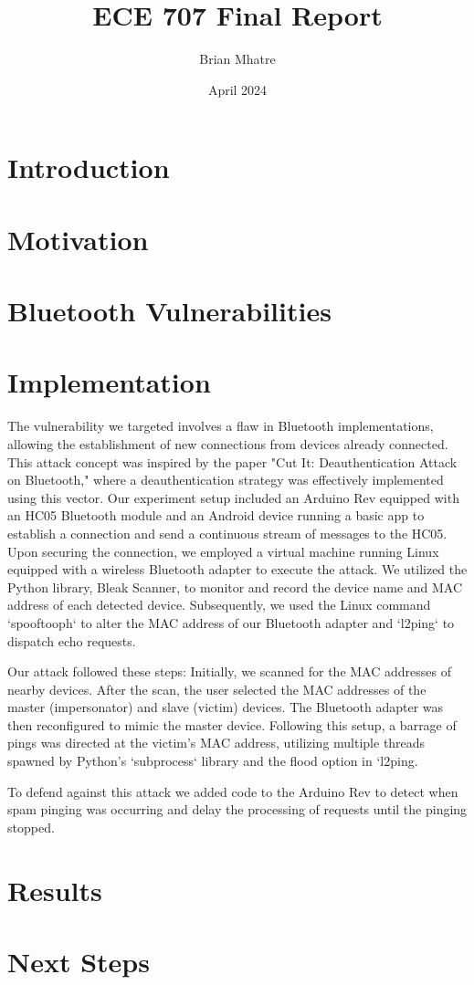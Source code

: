 \documentclass{article}
\title{ECE 707 Final Report}
\author{Brian Mhatre}
\date{April 2024}
\begin{document}
\maketitle

\section{Introduction}
\section{Motivation}
\section{Bluetooth Vulnerabilities}
\section{Implementation}
The vulnerability we targeted involves a flaw in Bluetooth implementations, allowing the establishment of new connections from devices already connected. This attack concept was inspired by the paper "Cut It: Deauthentication Attack on Bluetooth," where a deauthentication strategy was effectively implemented using this vector. Our experiment setup included an Arduino Rev equipped with an HC05 Bluetooth module and an Android device running a basic app to establish a connection and send a continuous stream of messages to the HC05. Upon securing the connection, we employed a virtual machine running Linux equipped with a wireless Bluetooth adapter to execute the attack. We utilized the Python library, Bleak Scanner, to monitor and record the device name and MAC address of each detected device. Subsequently, we used the Linux command `spooftooph` to alter the MAC address of our Bluetooth adapter and `l2ping` to dispatch echo requests.

Our attack followed these steps: Initially, we scanned for the MAC addresses of nearby devices. After the scan, the user selected the MAC addresses of the master (impersonator) and slave (victim) devices. The Bluetooth adapter was then reconfigured to mimic the master device. Following this setup, a barrage of pings was directed at the victim's MAC address, utilizing multiple threads spawned by Python's `subprocess` library and the flood option in `l2ping.

To defend against this attack we added code to the Arduino Rev to detect when spam pinging was occurring and delay the processing of requests until the pinging stopped.  
\section{Results}

\section{Next Steps}
\end{document}
